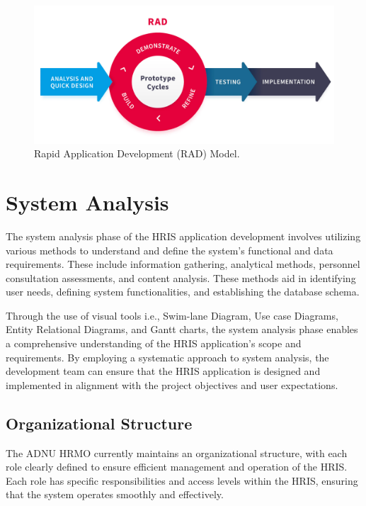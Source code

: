 \begin{figure}[H]
    \centering
    \includegraphics[width=1\linewidth]{figures/images/doc/rad.png}
    \caption{Rapid Application Development (RAD) Model.}
    \label{fig:rad}
\end{figure}
    
\section{System Analysis}
The system analysis phase of the HRIS application development involves utilizing various methods to understand and define the system's functional and data requirements. These include information gathering, analytical methods, personnel consultation assessments, and content analysis. These methods aid in identifying user needs, defining system functionalities, and establishing the database schema. 

Through the use of visual tools i.e., Swim-lane Diagram, Use case Diagrams, Entity Relational Diagrams, and Gantt charts, the system analysis phase enables a comprehensive understanding of the HRIS application's scope and requirements. By employing a systematic approach to system analysis, the development team can ensure that the HRIS application is designed and implemented in alignment with the project objectives and user expectations.

\subsection{Organizational Structure}

The ADNU HRMO currently maintains an organizational structure, with each role clearly defined to ensure efficient management and operation of the HRIS. Each role has specific responsibilities and access levels within the HRIS, ensuring that the system operates smoothly and effectively.

